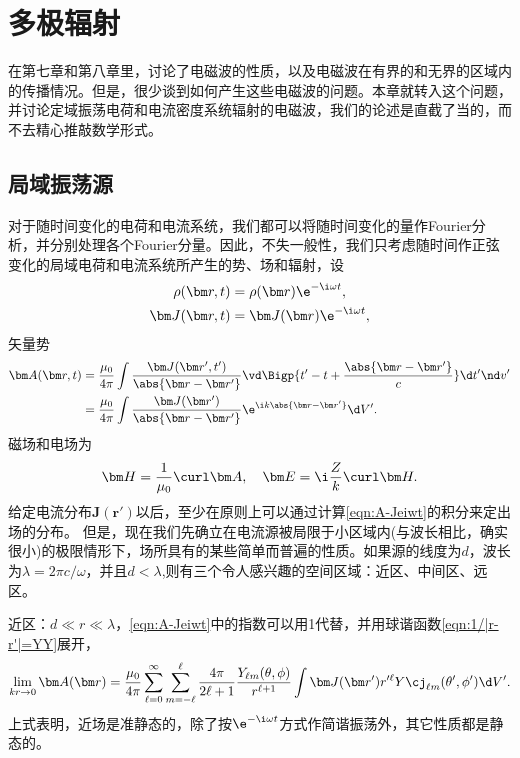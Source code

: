 \chapter{多极辐射}
\label{chap:multipole radiation}
在第七章和第八章里，讨论了电磁波的性质，以及电磁波在有界的和无界的区域内的传播情况。但是，很少谈到如何产生这些电磁波的问题。本章就转入这个问题，并讨论定域振荡电荷和电流密度系统辐射的电磁波，我们的论述是直截了当的，而不去精心推敲数学形式。%

\section{局域振荡源}
对于随时间变化的电荷和电流系统，我们都可以将随时间变化的量作Fourier分析，并分别处理各个Fourier分量。因此，不失一般性，我们只考虑随时间作正弦变化的局域电荷和电流系统所产生的势、场和辐射，设
\begin{align*}
    \rho(\bm r,t)&=\rho(\bm r)\e^{-\i\omega t},\\
    \bm J(\bm r,t)&=\bm J(\bm r)\e^{-\i\omega t},
\end{align*}
矢量势
\begin{align}
    \notag
    \bm A(\bm r,t)&=\frac{\mu_0}{4\pi}\int\frac{\bm J(\bm r',t')}{\abs{\bm r-\bm r'}}\vd\Bigp{t'-t+\frac{\abs{\bm r-\bm r'}}c}\d t'\nd v'\\
    \label{eqn:A-Jeiwt}
    &=\frac{\mu_0}{4\pi}\int\frac{\bm J(\bm r')}{\abs{\bm r-\bm r'}}\e^{\i k\abs{\bm r-\bm r'}}\d V'.
\end{align}
磁场和电场为
\[
    \bm H=\frac1{\mu_0}\curl\bm A,\quad\bm E=\i\frac Zk\curl\bm H.
\]
给定电流分布$\bm J(\bm r')$以后，至少在原则上可以通过计算\eqref{eqn:A-Jeiwt}的积分来定出场的分布。%
但是，现在我们先确立在电流源被局限于小区域内(与波长相比，确实很小)的极限情形下，场所具有的某些简单而普遍的性质。如果源的线度为$d$，波长为$\lambda=2\pi c/\omega$，并且$d<\lambda$,则有三个令人感兴趣的空间区域：近区、中间区、远区。

近区：$d\ll r\ll\lambda$，\eqref{eqn:A-Jeiwt}中的指数可以用1代替，并用球谐函数\eqref{eqn:1/|r-r'|=YY}展开，
\[
    \lim_{kr\to0}\bm A(\bm r)=\frac{\mu_0}{4\pi}\sum_{\ell=0}^\infty\sum_{m=-\ell}^\ell\frac{4\pi}{2\ell+1}\frac{Y_{\ell m}(\theta,\phi)}{r^{\ell+1}}\int\bm J(\bm r')r'^\ell Y\cj_{\ell m}(\theta',\phi')\d V'.
\]
上式表明，近场是准静态的，除了按$\e^{-\i\omega t}$方式作简谐振荡外，其它性质都是静态的。

